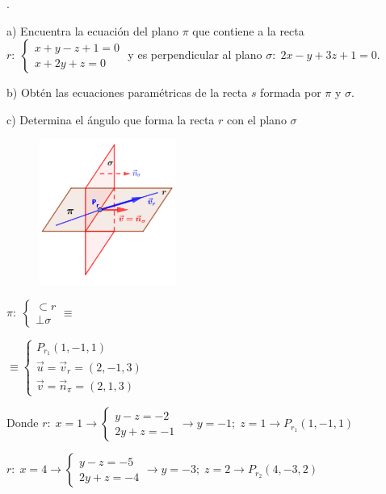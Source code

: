 \begin{ejre}.
	
	a) Encuentra la ecuación del plano $\pi$ que contiene a la recta $r:\; \begin{cases}x+y-z+1=0\\x+2y+z=0 \end{cases}$ y es perpendicular al plano $\sigma:\; 2x-y+3z+1=0$.
	
	b) Obtén las ecuaciones paramétricas de la recta $s$ formada por $\pi$ y $\sigma$.
	
	c) Determina el ángulo que forma la recta $r$ con el plano $\sigma$
\end{ejre}
\begin{proofw}\renewcommand{\qedsymbol}{$\diamond$}	
	
\begin{multicols}{2}
\begin{figure}[H]
		\centering
		\includegraphics[width=0.4\textwidth]{imagenes/imagenes11/T11IM26.png}
	\end{figure}

$\pi:\;\begin{cases} \subset r \\ \bot \sigma \end{cases} \equiv$

$\equiv \begin{cases} P_{r_1}(1,-1,1) \\ \vec u=\vec v_r=(2,-1,3) \\ \vec v=\vec n_{\pi}=(2,1,3) \end{cases}$

\end{multicols}

\noindent Donde $r:\; x=1\to \begin{cases} y-z=-2\\2y+z=-1 \end{cases} \to y=-1; \; z=1 \to P_{r_1}(1,-1,1)$

\noindent  $r:\; x=4\to \begin{cases} y-z=-5\\2y+z=-4 \end{cases} \to y=-3; \; z=2 \to P_{r_2}(4,-3,2)$


\end{proofw}
